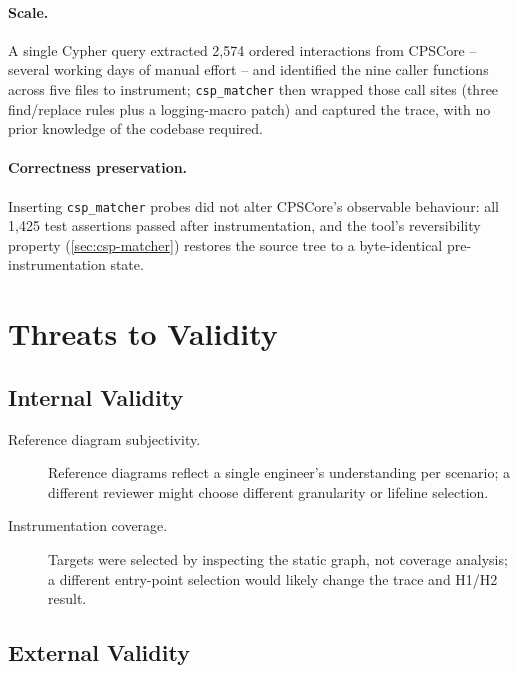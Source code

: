\paragraph{Scale.} A single Cypher query extracted 2,574 ordered
interactions from CPSCore -- several working days of manual effort --
and identified the nine caller functions across five files to
instrument; \texttt{csp\_matcher} then wrapped those call sites (three
find/replace rules plus a logging-macro patch) and captured the trace,
with no prior knowledge of the codebase required.

\paragraph{Correctness preservation.} Inserting \texttt{csp\_matcher}
probes did not alter CPSCore's observable behaviour: all 1,425 test
assertions passed after instrumentation, and the tool's reversibility
property (\cref{sec:csp-matcher}) restores the source tree to a
byte-identical pre-instrumentation state.

\section{Threats to Validity}

\subsection{Internal Validity}

\begin{description}
  \item[Reference diagram subjectivity.] Reference diagrams reflect a
    single engineer's understanding per scenario; a different reviewer
    might choose different granularity or lifeline selection.

  \item[Instrumentation coverage.] Targets were selected by inspecting
    the static graph, not coverage analysis; a different entry-point
    selection would likely change the trace and H1/H2 result.
\end{description}

\subsection{External Validity}


